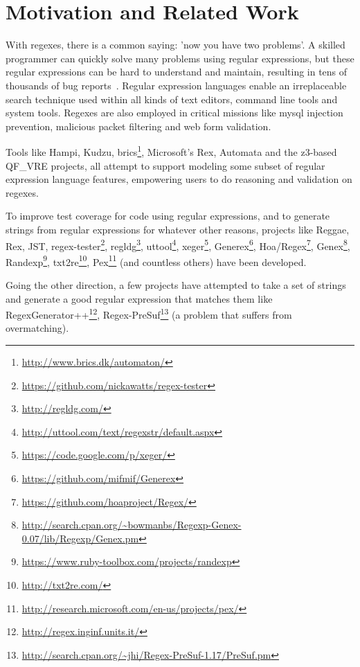 \section{Motivation and Related Work}
\label{sec:motivation}

With regexes, there is a common saying: 'now you have two problems'.
A skilled programmer can quickly solve many problems using regular expressions, but these regular expressions can be hard to understand and maintain, resulting in tens of thousands of bug reports~\cite{Spishak:2012:TSR:2318202.2318207}.
Regular expression languages enable an irreplaceable search technique used within all kinds of text editors, command line tools and system tools.
Regexes are also employed in critical missions like mysql injection prevention, malicious packet filtering  and web form validation.

Tools like Hampi, Kudzu, brics\footnote{\url{http://www.brics.dk/automaton/}}, Microsoft's Rex, Automata and the z3-based QF\_VRE projects, all attempt to support modeling some subset of regular expression language features, empowering users to do reasoning and validation on regexes.

To improve test coverage for code using regular expressions, and to generate strings from regular expressions for whatever other reasons, projects like Reggae, Rex, JST, regex-tester\footnote{\url{https://github.com/nickawatts/regex-tester}}, regldg\footnote{\url{http://regldg.com/}},
uttool\footnote{\url{http://uttool.com/text/regexstr/default.aspx}}, xeger\footnote{\url{https://code.google.com/p/xeger/}}, Generex\footnote{\url{https://github.com/mifmif/Generex}}, Hoa/Regex\footnote{\url{https://github.com/hoaproject/Regex/}}, Genex\footnote{\url{http://search.cpan.org/~bowmanbs/Regexp-Genex-0.07/lib/Regexp/Genex.pm}}, Randexp\footnote{\url{https://www.ruby-toolbox.com/projects/randexp}}, txt2re\footnote{\url{http://txt2re.com/}}, Pex\footnote{\url{http://research.microsoft.com/en-us/projects/pex/}} (and countless others) have been developed.

Going the other direction, a few projects have attempted to take a set of strings and generate a good regular expression that matches them like RegexGenerator++\footnote{\url{http://regex.inginf.units.it/}}, Regex-PreSuf\footnote{\url{http://search.cpan.org/~jhi/Regex-PreSuf-1.17/PreSuf.pm}} (a problem that suffers from overmatching).

